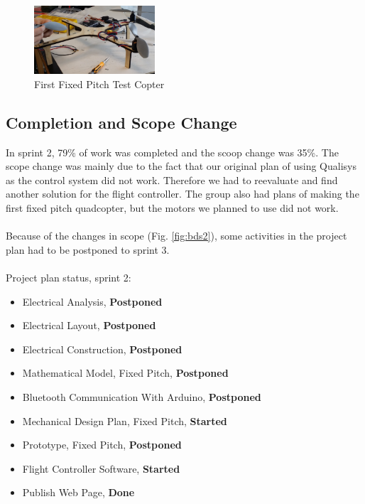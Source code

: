\begin{figure}[h]
        \centering
        \includegraphics[width = 0.4\textwidth]{VAPIQ-PICTURES//FirstFPQ}
         \caption{First Fixed Pitch Test Copter}
            \label{fig:firstfpq}
    \end{figure}  

\newpage     
\subsection{Completion and Scope Change}

In sprint 2, 79\% of work was completed and the scoop change was 35\%. The scope change was mainly due to the fact that our original plan of using Qualisys as the control system did not work. Therefore we had to reevaluate and find another solution for the flight controller. The group also had plans of making the first fixed pitch quadcopter, but the motors we planned to use did not work. \\
\\
Because of the changes in scope (Fig. \ref{fig:bds2}), some activities in the project plan had to be postponed to sprint 3.
\\\\
Project plan status, sprint 2:

\begin{itemize}
    \item 	Electrical Analysis, \textbf{Postponed}
    \item   Electrical Layout, \textbf{Postponed}
    \item   Electrical Construction, \textbf{Postponed}
    \item   Mathematical Model, Fixed Pitch, \textbf{Postponed}
    \item 	Bluetooth Communication With Arduino, \textbf {Postponed}
    \item 	Mechanical Design Plan, Fixed Pitch, \textbf{Started}
    \item 	Prototype, Fixed Pitch, \textbf{Postponed}
   	\item   Flight Controller Software, \textbf{Started}
    \item 	Publish Web Page, \textbf{Done}
\end{itemize}

